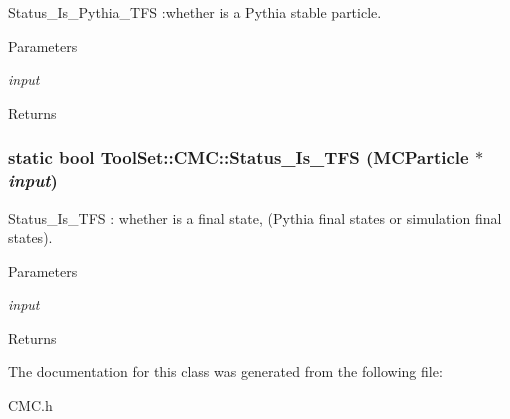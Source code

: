 Status\_\-Is\_\-Pythia\_\-TFS :whether is a Pythia stable particle. 
\begin{DoxyParams}{Parameters}
\item[{\em input}]\end{DoxyParams}
\begin{DoxyReturn}{Returns}

\end{DoxyReturn}
\hypertarget{classToolSet_1_1CMC_a662c5f9d64c7916f988e4ff15598d4ed}{
\subsubsection[{Status\_\-Is\_\-TFS}]{\setlength{\rightskip}{0pt plus 5cm}static bool ToolSet::CMC::Status\_\-Is\_\-TFS (MCParticle $\ast$ {\em input})}}
\label{classToolSet_1_1CMC_a662c5f9d64c7916f988e4ff15598d4ed}


Status\_\-Is\_\-TFS : whether is a final state, (Pythia final states or simulation final states). 
\begin{DoxyParams}{Parameters}
\item[{\em input}]\end{DoxyParams}
\begin{DoxyReturn}{Returns}

\end{DoxyReturn}


The documentation for this class was generated from the following file:\begin{DoxyCompactItemize}
\item 
CMC.h\end{DoxyCompactItemize}
